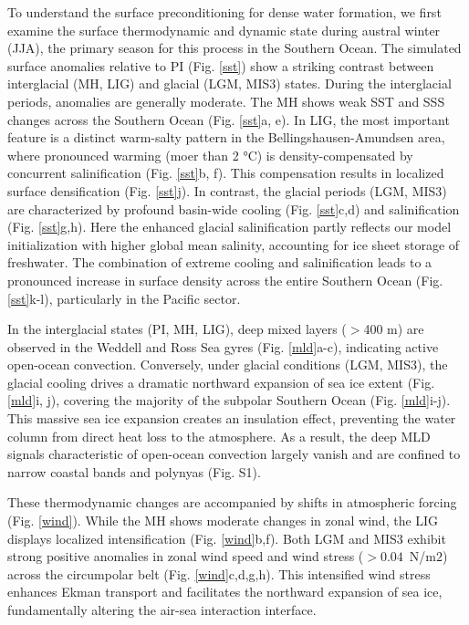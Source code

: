 \documentclass[draft]{agujournal2025}
\begin{document}
To understand the surface preconditioning for dense water formation, we first examine the surface thermodynamic and dynamic state during austral winter (JJA), the primary season for this process in the Southern Ocean. %
The simulated surface anomalies relative to PI (Fig. \ref{sst}) show a striking contrast between interglacial (MH, LIG) and glacial (LGM, MIS3) states. During the interglacial periods, anomalies are generally moderate. The MH shows weak SST and SSS changes across the Southern Ocean (Fig. \ref{sst}a, e). In LIG, the most important feature is a distinct warm-salty pattern in the Bellingshausen-Amundsen area, where pronounced warming (moer than 2 °C) is density-compensated by concurrent salinification (Fig. \ref{sst}b, f). This compensation results in localized surface densification (Fig. \ref{sst}j).
In  contrast, the glacial periods (LGM, MIS3) are characterized by profound basin-wide cooling (Fig. \ref{sst}c,d) and salinification (Fig. \ref{sst}g,h). Here the enhanced glacial salinification partly reflects our model initialization with higher global mean salinity, accounting for ice sheet storage of freshwater. The combination of extreme cooling and salinification leads to a pronounced increase in surface density across the entire Southern Ocean (Fig. \ref{sst}k-l), particularly in the Pacific sector.




In the interglacial states (PI, MH, LIG),  deep mixed layers ($>$400 m) are observed in the Weddell and Ross Sea gyres (Fig. \ref{mld}a-c), indicating active open-ocean convection. Conversely, under glacial conditions (LGM, MIS3), the glacial cooling drives a dramatic northward expansion of sea ice extent (Fig. \ref{mld}i, j), covering the majority of the subpolar Southern Ocean (Fig. \ref{mld}i-j). This massive sea ice expansion creates an insulation effect, preventing the water column from direct heat loss to the atmosphere. As a result, the deep MLD signals characteristic of open-ocean convection largely vanish and are confined to narrow coastal bands and polynyas (Fig. S1). %


These thermodynamic changes are accompanied by shifts in atmospheric forcing (Fig. \ref{wind}). While the MH shows moderate changes in zonal wind, the LIG displays localized intensification (Fig. \ref{wind}b,f). Both LGM and MIS3 exhibit strong positive anomalies in zonal wind speed and wind stress ($>0.04$~N/m$2$) across the circumpolar belt (Fig. \ref{wind}c,d,g,h). This intensified wind stress enhances Ekman transport and facilitates the northward expansion of sea ice, fundamentally altering the air-sea interaction interface.
\end{document}
